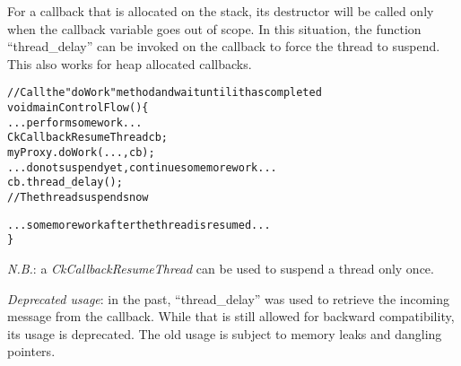 For a callback that is allocated on the stack, its destructor will be called only
when the callback variable goes out of scope. In this
situation, the function ``thread\_delay'' can be invoked on the callback to
force the thread to suspend. This also works for heap allocated callbacks.

\begin{alltt}
// Call the "doWork" method and wait until it has completed
void mainControlFlow() \{
  ...perform some work...
  CkCallbackResumeThread cb;
  myProxy.doWork(...,cb);
  ...do not suspend yet, continue some more work...
  cb.thread\_delay();
  // The thread suspends now

  ...some more work after the thread is resumed...
\}
\end{alltt}

{\em N.B.}: a {\em CkCallbackResumeThread} can be used to suspend a thread
only once.

{\em Deprecated usage}: in the past, ``thread\_delay'' was used to retrieve the
incoming message from the callback. While that is still allowed for backward
compatibility, its usage is deprecated. The old usage is subject to memory
leaks and dangling pointers.






